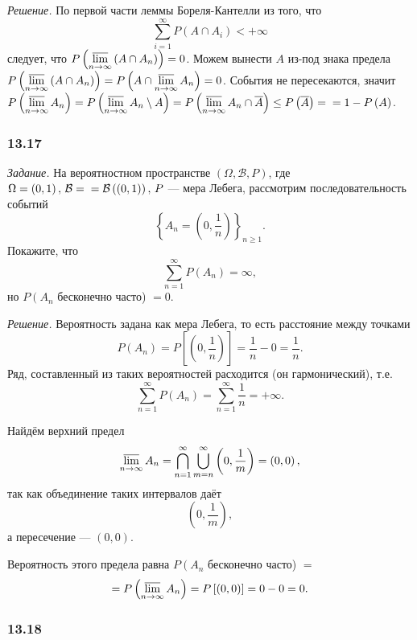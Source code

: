 \textit{Решение.} По первой части леммы Бореля-Кантелли из того, что
$$ \sum \limits_{i=1}^{ \infty } P \left( A \cap A_i \right) < + \infty $$
следует, что $P \left( \varlimsup \limits_{n \to \infty } \left( A \cap A_n \right) \right) = 0$.
Можем вынести $A$ из-под знака предела
$P \left( \varlimsup \limits_{n \to \infty } \left( A \cap A_n \right) \right) =
P \left( A \cap \varlimsup \limits_{n \to \infty } A_n \right) =
0$.
События не пересекаются,
значит
$P \left( \varlimsup \limits_{n \to \infty } A_n \right) =
P \left( \varlimsup \limits_{n \to \infty } A_n \setminus A \right) =
P \left( \varlimsup \limits_{n \to \infty } A_n \cap \overline{A} \right) \leq
P \left( \overline{A} \right) = \\
= 1 - P \left( A \right) $.

\subsubsection*{13.17}

\textit{Задание.}
На вероятностном пространстве
$ \left( \Omega, \mathcal{B}, P \right) $, где $ \Omega = \left( 0, 1 \right), \, \mathcal{B} = \\
= \mathcal{B} \left( \left( 0, 1 \right) \right), \, P$ ---
мера Лебега, рассмотрим последовательность событий
$$ \left\{ A_n = \left( 0, \frac{1}{n} \right) \right\}_{n \geq 1}.$$
Покажите, что
$$ \sum \limits_{n=1}^{ \infty } P \left( A_n \right) =
\infty,$$
но $P \left( A_n \right.$ бесконечно часто) $= 0$.

\textit{Решение.}
Вероятность задана как мера Лебега,
то есть расстояние между точками
$$P \left( A_n \right) =
P \left[ \left( 0, \frac{1}{n} \right) \right] =
\frac{1}{n} - 0 =
\frac{1}{n}.$$
Ряд, составленный из таких вероятностей расходится (он гармонический), т.е.
$$ \sum \limits_{n=1}^{ \infty} P \left( A_n \right) =
\sum \limits_{n=1}^{ \infty } \frac{1}{n} =
+ \infty.$$

Найдём верхний предел
$$ \varlimsup \limits_{n \to \infty } A_n =
\bigcap \limits_{n=1}^{ \infty } \bigcup \limits_{m=n}^{ \infty } \left( 0, \frac{1}{m} \right) =
\left( 0, 0 \right),$$
так как объединение таких интервалов даёт
$$ \left( 0, \frac{1}{m} \right),$$
а пересечение --- $ \left( 0, 0 \right) $.

Вероятность этого предела равна
$P \left( A_n \right.$ бесконечно часто) $=$
$$= P \left( \varlimsup \limits_{n \to \infty } A_n \right) =
P \left[ \left( 0, 0 \right) \right] =
0 - 0 =
0.$$

\subsubsection*{13.18}

